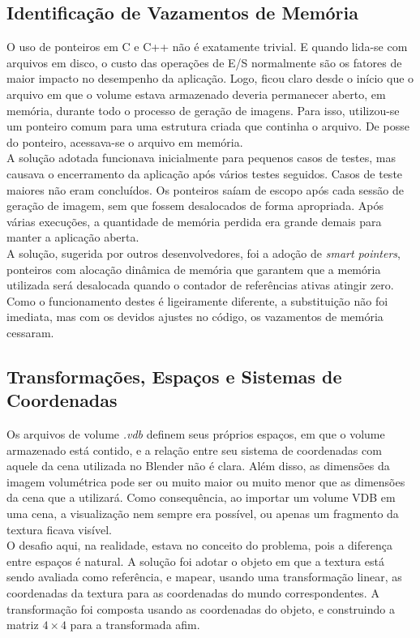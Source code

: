 \subsection*{Identificação de Vazamentos de Memória}
O uso de ponteiros em C e C++ não é exatamente trivial. E quando lida-se com arquivos em disco, o custo das operações de E/S normalmente são os fatores de maior impacto no desempenho da aplicação. Logo, ficou claro desde o início que o arquivo em que o volume estava armazenado deveria permanecer aberto, em memória, durante todo o processo de geração de imagens. Para isso, utilizou-se um ponteiro comum para uma estrutura criada que continha o arquivo. De posse do ponteiro, acessava-se o arquivo em memória.\\

A solução adotada funcionava inicialmente para pequenos casos de testes, mas causava o encerramento da aplicação após vários testes seguidos. Casos de teste maiores não eram concluídos. Os ponteiros saíam de escopo após cada sessão de geração de imagem, sem que fossem desalocados de forma apropriada. Após várias execuções, a quantidade de memória perdida era grande demais para manter a aplicação aberta.\\

A solução, sugerida por outros desenvolvedores, foi a adoção de \emph{smart pointers}, ponteiros com alocação dinâmica de memória que garantem que a memória utilizada será desalocada quando o contador de referências ativas atingir zero. Como o funcionamento destes é ligeiramente diferente, a substituição não foi imediata, mas com os devidos ajustes no código, os vazamentos de memória cessaram.

\subsection*{Transformações, Espaços e Sistemas de Coordenadas}
Os arquivos de volume {\it .vdb} definem seus próprios espaços, em que o volume armazenado está contido, e a relação entre seu sistema de coordenadas com aquele da cena utilizada no Blender não é clara. Além disso, as dimensões da imagem volumétrica pode ser ou muito maior ou muito menor que as dimensões da cena que a utilizará. Como consequência, ao importar um volume VDB em uma cena, a visualização nem sempre era possível, ou apenas um fragmento da textura ficava visível. \\

O desafio aqui, na realidade, estava no conceito do problema, pois a diferença entre espaços é natural. A solução foi adotar o objeto em que a textura está sendo avaliada como referência, e mapear, usando uma transformação linear, as coordenadas da textura para as coordenadas do mundo correspondentes. A transformação foi composta usando as coordenadas do objeto, e construindo a matriz $4 \times 4$ para a transformada afim.

